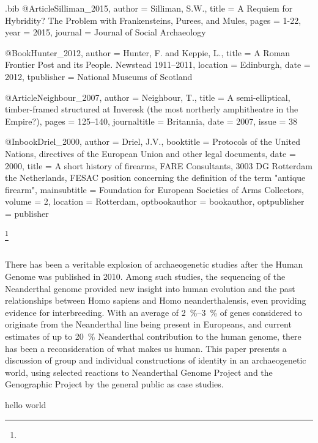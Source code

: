 \begin{filecontents}{\identifier.bib}
@Article{Silliman_2015,
  author =  {Silliman, S.W.},
  title =   {A Requiem for Hybridity? The Problem with Frankensteins, Purees, and Mules},
  pages =   {1-22},
  year =    {2015},
  journal = {Journal of Social Archaeology}
}

@Book{Hunter_2012,
  author =     {Hunter, F. and Keppie, L.},
  title =      {A Roman Frontier Post and its People. Newstead 1911–2011},
  location =   {Edinburgh},
  date =       {2012},
  tpublisher = {National Museums of Scotland}
}

@Article{Neighbour_2007,
  author =       {Neighbour, T.},
  title =        {A semi-elliptical, timber-framed structured at Inveresk (the most northerly amphitheatre in the Empire?)},
  pages =        {125–140},
  journaltitle = {Britannia},
  date =         {2007},
  issue =        {38}
}

@Inbook{Driel_2000,
  author =        {Driel, J.V.},
  booktitle =     {Protocols of the United Nations, directives of the European Union and other legal documents},
  date =          {2000},
  title =         {A short history of firearms, FARE Consultants, 3003 DG Rotterdam the Netherlands, FESAC position concerning the definition of the term "antique firearm"},
  mainsubtitle =  {Foundation for European Societies of Arms Collectors},
  volume =        {2},
  location =      {Rotterdam},
  optbookauthor = {bookauthor},
  optpublisher =  {publisher}
}


\end{filecontents}

	

\IJSRAopening

	{\Large\scshape
	\shortauthor\footnote{\thanknote}}\\[1em]
	\email\\
	\affiliation

\IJSRAmid

\begin{IJSRAabstract}
There has been a veritable explosion of archaeogenetic studies after the Human Genome was published in 2010. Among such studies, the sequencing of the Neanderthal genome provided new insight into human evolution and the past relationships between Homo sapiens and Homo neanderthalensis, even providing evidence for interbreeding. With an average of \SIrange[range-phrase=--]{2}{3}{\percent} of genes considered to originate from the Neanderthal line being present in Europeans, and current estimates of up to \SI{20}{\percent} Neanderthal contribution to the human genome, there has been a reconsideration of what makes us human. This paper presents a discussion of group and individual constructions of identity in an archaeogenetic world, using selected reactions to Neanderthal Genome Project and the Genographic Project by the general public as case studies.

\end{IJSRAabstract}


hello world

\cite{Zeder_2006c,Green_2010,Wilson_2012,Caruana_1996,Mizoguchi_2015,Sayer_2013,Liddell1940,Meyer_2012,Thapar_1991,Trigger_2006a,Trigger_2006,Leidwanger_2014,Lal_2001,Meta2006,Tilley_1994,Monfort_2006,OBrien2009,Silliman_2015,Hunter_2012,Neighbour_2007,Driel_2000}
\IJSRAclosing
